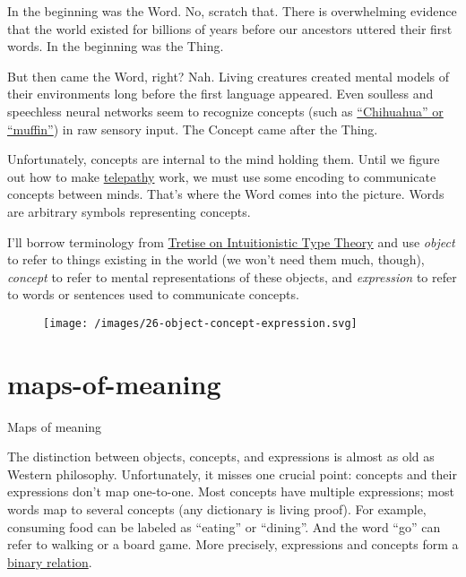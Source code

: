 \documentclass{article}
\begin{document}
In the beginning was the Word.
No, scratch that.
There is overwhelming evidence that the world existed for billions of years before our ancestors uttered their first words.
In the beginning was the Thing.

But then came the Word, right? Nah.
Living creatures created mental models of their environments long before the first language appeared.
Even soulless and speechless neural networks seem to recognize concepts (such as \href{https://github.com/rcgc/chihuahua-muffin}{``Chihuahua'' or ``muffin''}) in raw sensory input.
The Concept came after the Thing.

Unfortunately, concepts are internal to the mind holding them.
Until we figure out how to make \href{https://en.wikipedia.org/wiki/Telepathy}{telepathy} work, we must use some encoding to communicate concepts between minds.
That's where the Word comes into the picture.
Words are arbitrary symbols representing concepts.

I'll borrow terminology from \href{https://link.springer.com/book/10.1007/978-94-007-1736-7}{Tretise on Intuitionistic Type Theory} and use
\emph{object} to refer to things existing in the world (we won't need them much, though),
\emph{concept} to refer to mental representations of these objects,
and \emph{expression} to refer to words or sentences used to communicate concepts.

\begin{figure}[grayscale-diagram]
  \texttt{[image: /images/26-object-concept-expression.svg]}
\end{figure}

\section{maps-of-meaning}{Maps of meaning}

The distinction between objects, concepts, and expressions is almost as old as Western philosophy.
Unfortunately, it misses one crucial point: concepts and their expressions don't map one-to-one.
Most concepts have multiple expressions; most words map to several concepts (any dictionary is living proof).
For example, consuming food can be labeled as ``eating'' or ``dining''.
And the word ``go'' can refer to walking or a board game.
More precisely, expressions and concepts form a \href{https://en.wikipedia.org/wiki/Binary_relation}{binary relation}.
\end{document}
